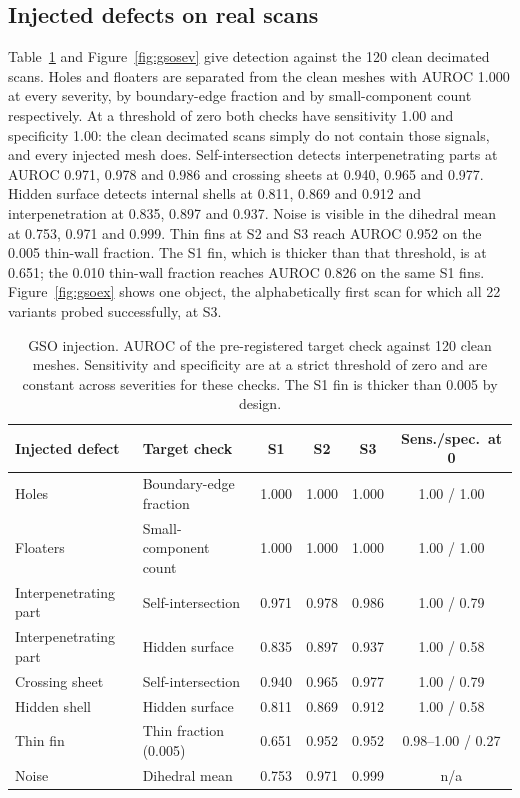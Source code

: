 \subsection{Injected defects on real scans}
\label{sec:gso}

Table~\ref{tab:gso} and Figure~\ref{fig:gsosev} give detection against the 120 clean decimated scans.
Holes and floaters are separated from the clean meshes with AUROC 1.000 at every severity, by boundary-edge fraction and by small-component count respectively.
At a threshold of zero both checks have sensitivity 1.00 and specificity 1.00: the clean decimated scans simply do not contain those signals, and every injected mesh does.
Self-intersection detects interpenetrating parts at AUROC 0.971, 0.978 and 0.986 and crossing sheets at 0.940, 0.965 and 0.977.
Hidden surface detects internal shells at 0.811, 0.869 and 0.912 and interpenetration at 0.835, 0.897 and 0.937.
Noise is visible in the dihedral mean at 0.753, 0.971 and 0.999.
Thin fins at S2 and S3 reach AUROC 0.952 on the 0.005 thin-wall fraction.
The S1 fin, which is thicker than that threshold, is at 0.651; the 0.010 thin-wall fraction reaches AUROC 0.826 on the same S1 fins.
Figure~\ref{fig:gsoex} shows one object, the alphabetically first scan for which all 22 variants probed successfully, at S3.

\begin{table}[t]
  \centering
  \caption{GSO injection. AUROC of the pre-registered target check against 120 clean meshes. Sensitivity and specificity are at a strict threshold of zero and are constant across severities for these checks. The S1 fin is thicker than 0.005 by design.}
  \label{tab:gso}
  \small
  \begin{tabular}{llcccc}
    \toprule
    Injected defect & Target check & S1 & S2 & S3 & Sens./spec.\ at 0 \\
    \midrule
    Holes & Boundary-edge fraction & 1.000 & 1.000 & 1.000 & 1.00 / 1.00 \\
    Floaters & Small-component count & 1.000 & 1.000 & 1.000 & 1.00 / 1.00 \\
    Interpenetrating part & Self-intersection & 0.971 & 0.978 & 0.986 & 1.00 / 0.79 \\
    Interpenetrating part & Hidden surface & 0.835 & 0.897 & 0.937 & 1.00 / 0.58 \\
    Crossing sheet & Self-intersection & 0.940 & 0.965 & 0.977 & 1.00 / 0.79 \\
    Hidden shell & Hidden surface & 0.811 & 0.869 & 0.912 & 1.00 / 0.58 \\
    Thin fin & Thin fraction (0.005) & 0.651 & 0.952 & 0.952 & 0.98--1.00 / 0.27 \\
    Noise & Dihedral mean & 0.753 & 0.971 & 0.999 & n/a \\
    \bottomrule
  \end{tabular}
\end{table}

